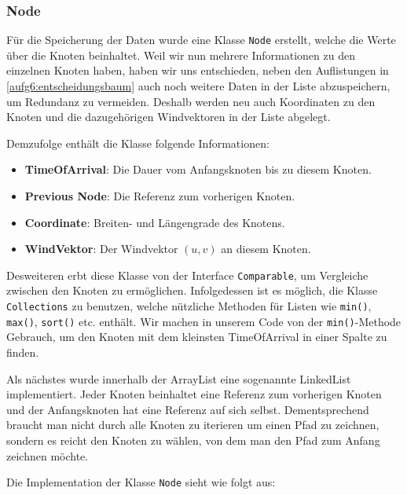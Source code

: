 

\subsubsection{Node}
Für die Speicherung der Daten wurde eine Klasse \texttt{Node} erstellt, welche die
Werte über die Knoten beinhaltet. Weil wir nun mehrere Informationen zu den
einzelnen Knoten haben, haben wir uns entschieden, neben den Auflistungen in
\ref{aufg6:entscheidungsbaum} auch noch weitere Daten in der Liste
abzuspeichern, um Redundanz zu vermeiden. Deshalb werden neu auch Koordinaten
zu den Knoten und die dazugehörigen Windvektoren in der Liste abgelegt.

Demzufolge enthält die Klasse folgende Informationen:

\begin{itemize}
\item \textbf{TimeOfArrival}: Die Dauer vom Anfangsknoten bis zu diesem Knoten.
\item \textbf{Previous Node}: Die Referenz zum vorherigen Knoten.
\item \textbf{Coordinate}: Breiten- und Längengrade des Knotens.
\item \textbf{WindVektor}: Der Windvektor $(u, v)$ an diesem Knoten.
\end{itemize}

Desweiteren erbt diese Klasse von der Interface \texttt{Comparable}, um Vergleiche
zwischen den Knoten zu ermöglichen. Infolgedessen ist es möglich, die Klasse
\texttt{Collections}\cite{oracle:Collections} zu benutzen, welche nützliche Methoden für Listen wie \texttt{min()},
\texttt{max()}, \texttt{sort()} etc. enthält. Wir machen in unserem Code von der
\texttt{min()}-Methode Gebrauch, um den Knoten mit dem kleinsten TimeOfArrival in
einer Spalte zu finden.

Als nächstes wurde innerhalb der ArrayList eine sogenannte LinkedList
implementiert. Jeder Knoten beinhaltet eine Referenz zum vorherigen Knoten und
der Anfangsknoten hat eine Referenz auf sich selbst. Dementsprechend braucht
man nicht durch alle Knoten zu iterieren um einen Pfad zu zeichnen, sondern es
reicht den Knoten zu wählen, von dem man den Pfad zum Anfang zeichnen möchte.

Die Implementation der Klasse \texttt{Node} sieht wie folgt aus:




